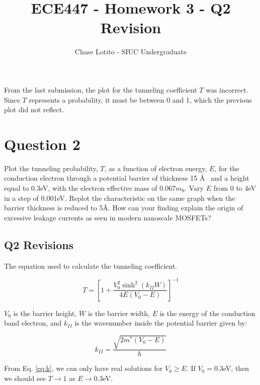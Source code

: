 \documentclass{article}
\title{ECE447 - Homework 3 - Q2 Revision}
\author{Chase Lotito - SIUC Undergraduate}
\date{}
\begin{document}
\pagestyle{fancy}

\maketitle

\fancyhead{}


From the last submission, the plot for the tunneling coefficient \(T\) was incorrect. Since \(T\) represents a probability, it must be between 0 and 1, which the previous plot did not reflect.

\section{Question 2}

Plot the tunneling probability, \(T\), as a function of electron energy, \(E\), for the conduction electron through a potential barrier of thickness 15 \AA ~ and a height equal to 0.3eV, with the electron effective mass of \(0.067m_0\). Vary \(E\) from 0 to 4eV in a step of 0.001eV. Replot the characteristic on the same graph when the barrier thickness is reduced to 5\AA. How can your finding explain the origin of excessive leakage currents as seen in modern nanoscale MOSFETs?

\subsection{Q2 Revisions}

The equation used to calculate the tunneling coefficient.

\begin{equation}\label{eq:tunnel}
    T = \left[ 1 + \frac{V^2_0 \sinh^2 (k_{II} W)}{4 E(V_0 - E)} \right]^{-1}
\end{equation}

\(V_0\) is the barrier height, \(W\) is the barrier width, \(E\) is the energy of the conduction band electron, and \(k_{II}\) is the wavenumber inside the potential barrier given by:

\begin{equation}\label{eq:k}
k_{II} = \frac{\sqrt{2  m^* (V_0 - E)}}{\hbar} 
\end{equation}

From Eq. \ref{eq:k}, we can only have real solutions for \(V_0 \geq E\). If \(V_0 = 0.3\)eV, then we should see \(T \to 1\) as \(E \to 0.3\)eV.
\end{document}
